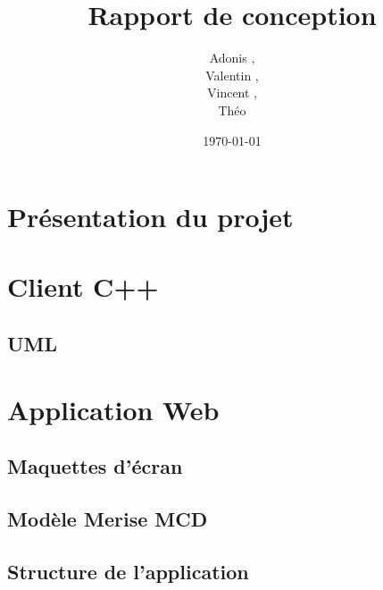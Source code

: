 \documentclass[a4paper]{article}
\title{Rapport de conception}
\author{Adonis \bsc{Najimi},\\
 Valentin \bsc{Stern},\\
 Vincent \bsc{Albert},\\
 Théo \bsc{Gerriet}}
\date{\today}
\begin{document}
\maketitle
\section{Présentation du projet}
\section{Client C++}
\subsection{UML}
\section{Application Web}
\subsection{Maquettes d'écran}
\subsection{Modèle Merise MCD}

\subsection{Structure de l'application}
\end{document}
